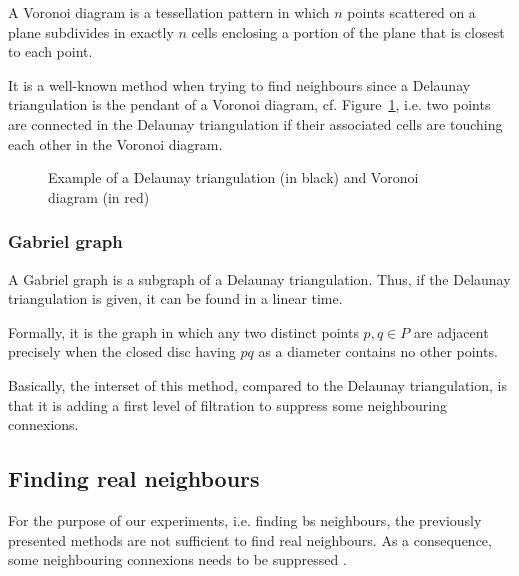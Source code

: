 \documentclass[lettersize,journal,english]{IEEEtran}
\begin{document}
A Voronoi diagram is a tessellation pattern in which $n$ points scattered on a plane subdivides in 
exactly $n$ cells enclosing a portion of the plane that is closest to each point. 

It is a well-known method when trying to find neighbours \cite{delaunay_neighbor}
since a Delaunay triangulation is the pendant of a Voronoi diagram, cf. Figure~\ref{fig:del_tri}, i.e. two points are connected in the
Delaunay triangulation if their associated cells are touching each other in the Voronoi diagram.

\begin{figure}
    \centering
    \caption{Example of a Delaunay triangulation (in black) and Voronoi diagram (in red)}
    \label{fig:del_tri}
\end{figure}

\subsubsection{Gabriel graph}
A Gabriel graph \cite{10.2307/2412323} is a subgraph of a Delaunay triangulation. Thus, if the Delaunay triangulation is given, it can be found in a linear time. 

Formally, it is the graph in which any two distinct points $p, q \in P$ are adjacent precisely when the closed disc having $pq$ as a diameter contains no other points.

Basically, the interset of this method, compared to the Delaunay triangulation, is that it is adding a first level of filtration to suppress some neighbouring connexions.

\subsection{Finding real neighbours}
For the purpose of our experiments, i.e. finding \acrshort{bs} neighbours, the previously presented methods are not sufficient to find real neighbours.
As a consequence, some neighbouring connexions needs to be suppressed \cite{patent_neighs}.
\end{document}

